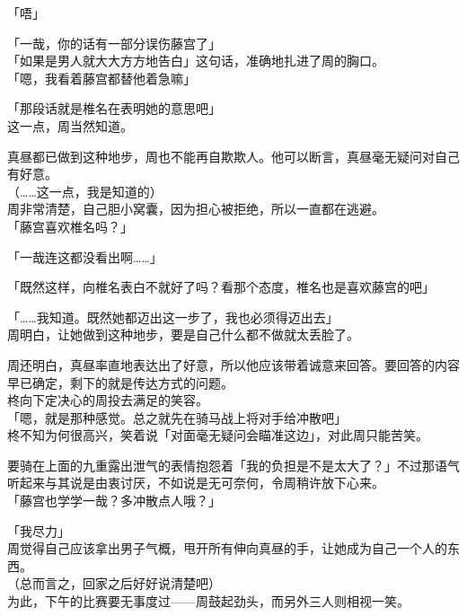 「唔」

「一哉，你的话有一部分误伤藤宫了」\\

「如果是男人就大大方方地告白」这句话，准确地扎进了周的胸口。\\

「嗯，我看着藤宫都替他着急嘛」

「那段话就是椎名在表明她的意思吧」\\

这一点，周当然知道。

真昼都已做到这种地步，周也不能再自欺欺人。他可以断言，真昼毫无疑问对自己有好意。\\

（……这一点，我是知道的）\\

周非常清楚，自己胆小窝囊，因为担心被拒绝，所以一直都在逃避。\\

「藤宫喜欢椎名吗？」

「一哉连这都没看出啊……」

「既然这样，向椎名表白不就好了吗？看那个态度，椎名也是喜欢藤宫的吧」

「……我知道。既然她都迈出这一步了，我也必须得迈出去」\\

周明白，让她做到这种地步，要是自己什么都不做就太丢脸了。

周还明白，真昼率直地表达出了好意，所以他应该带着诚意来回答。要回答的内容早已确定，剩下的就是传达方式的问题。\\

柊向下定决心的周投去满足的笑容。\\

「嗯，就是那种感觉。总之就先在骑马战上将对手给冲散吧」\\

柊不知为何很高兴，笑着说「对面毫无疑问会瞄准这边」，对此周只能苦笑。

要骑在上面的九重露出泄气的表情抱怨着「我的负担是不是太大了？」不过那语气听起来与其说是由衷讨厌，不如说是无可奈何，令周稍许放下心来。\\

「藤宫也学学一哉？多冲散点人哦？」

「我尽力」\\

周觉得自己应该拿出男子气概，甩开所有伸向真昼的手，让她成为自己一个人的东西。\\

（总而言之，回家之后好好说清楚吧）\\

为此，下午的比赛要无事度过——周鼓起劲头，而另外三人则相视一笑。
